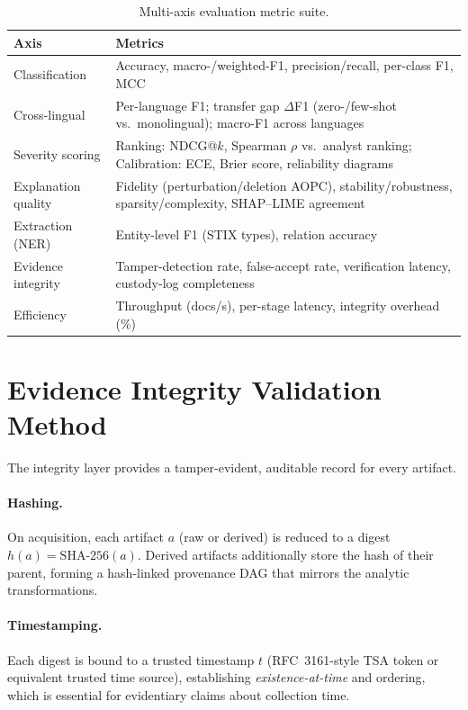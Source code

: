 \documentclass[11pt,a4paper]{article}
\begin{document}
\begin{table}[t]
\centering
\caption{Multi-axis evaluation metric suite.}
\label{tab:metrics}
\small
\begin{tabular}{@{}p{3.2cm}p{8.8cm}@{}}
\toprule
\textbf{Axis} & \textbf{Metrics} \\
\midrule
Classification & Accuracy, macro-/weighted-F1, precision/recall, per-class F1, MCC \\
Cross-lingual & Per-language F1; transfer gap $\Delta$F1 (zero-/few-shot vs.\ monolingual); macro-F1 across languages \\
Severity scoring & Ranking: NDCG@$k$, Spearman $\rho$ vs.\ analyst ranking; Calibration: ECE, Brier score, reliability diagrams \\
Explanation quality & Fidelity (perturbation/deletion AOPC), stability/robustness, sparsity/complexity, SHAP--LIME agreement~\cite{kalakoti2025evaluating,salih2023perspective} \\
Extraction (NER) & Entity-level F1 (STIX types), relation accuracy~\cite{wang2022aptner,echchammakhy2025cyberner} \\
Evidence integrity & Tamper-detection rate, false-accept rate, verification latency, custody-log completeness~\cite{lone2019forensicchain} \\
Efficiency & Throughput (docs/s), per-stage latency, integrity overhead (\%) \\
\bottomrule
\end{tabular}
\end{table}

\section{Evidence Integrity Validation Method}\label{sec:integrity}

The integrity layer provides a tamper-evident, auditable record for every artifact.

\paragraph{Hashing.} On acquisition, each artifact $a$ (raw or derived) is reduced to a
digest $h(a)=\text{SHA-256}(a)$. Derived artifacts additionally store the hash of their
parent, forming a hash-linked provenance DAG that mirrors the analytic transformations.

\paragraph{Timestamping.} Each digest is bound to a trusted timestamp $t$ (RFC~3161-style
TSA token or equivalent trusted time source), establishing \emph{existence-at-time} and
ordering, which is essential for evidentiary claims about collection time.
\end{document}
